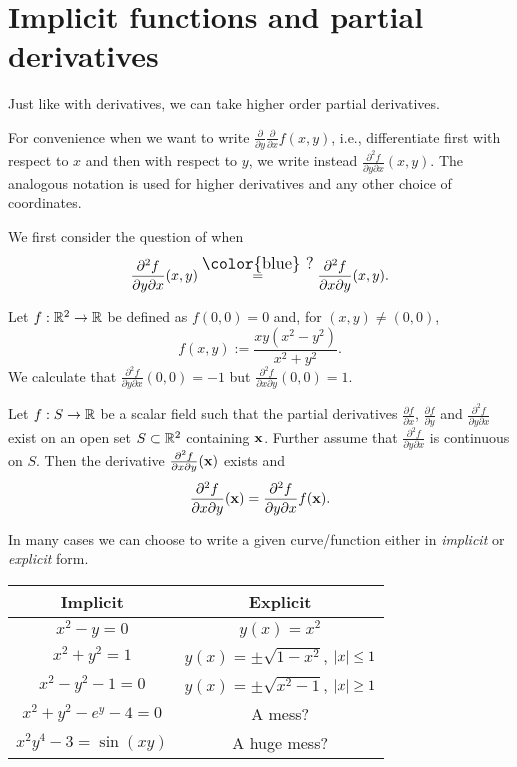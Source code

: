 \section{Implicit functions and partial derivatives}

Just like with derivatives, we can take higher order partial derivatives.
\begin{remark*}
    For convenience when we want to write \(\frac{\partial}{\partial y}\frac{\partial}{\partial x}f(x,y) \), i.e., differentiate first with respect to \(x\) and then with respect to \(y\), we write instead \(\frac{\partial^2 f}{\partial y \partial x}(x,y) \).
    The analogous notation is used for higher derivatives and any other choice of coordinates.
\end{remark*}

We first consider the question of when
\[
    \frac{\partial^2 f}{\partial y \partial x}(x,y)
    \overset{\text{\large\color{blue} ?}}{=}
    \frac{\partial^2 f}{\partial x \partial y}(x,y).
\]

\begin{example*}
    Let \(f:\mathbb{R}^2 \to \mathbb{R}\) be defined as \(f(0,0)=0\) and, for \((x,y)\neq (0,0)\),
    \[
        f(x,y) := \frac{x y(x^2 - y^2)}{x^2 + y^2}.
    \]
    We calculate that \(\frac{\partial^2 f}{\partial y \partial x} (0,0) = -1\) but
    \(\frac{\partial^2 f}{\partial x \partial y}(0,0) = 1\).
\end{example*}

\begin{theorem}
    Let \(f:S\to\mathbb{R}\) be a scalar field such that the partial derivatives \(\frac{\partial f}{\partial x }\), \(\frac{\partial f}{\partial y}\) and \(\frac{\partial^2 f}{\partial y \partial x} \) exist on an open set \(S\subset \mathbb{R}^2\) containing \(\mathbf{x}\).
    Further assume that \(\frac{\partial^2 f}{\partial y \partial x} \) is continuous on \(S\).
    Then the derivative \(\frac{\partial^2 f}{\partial x \partial y} (\mathbf{x})\) exists and
    \[
        \frac{\partial^2 f}{\partial x \partial y} (\mathbf{x})=\frac{\partial^2 f}{\partial y \partial x}  f(\mathbf{x}).
    \]
\end{theorem}

In many cases we can choose to write a given curve/function either in \emph{implicit} or \emph{explicit} form.

\begin{center}
    \begin{tabular}{c | c}
        \textbf{Implicit}         & \textbf{Explicit}                              \\
        \hline
        \(x^2-y=0\)               & \(y(x) = x^2\)                                 \\
        \(x^2+y^2=1\)             & \(y(x) = \pm \sqrt{1-x^2}\), \(\left|x\right|\leq 1\) \\
        \(x^2-y^2-1=0\)           & \(y(x) = \pm \sqrt{x^2-1}\), \(\left|x\right|\geq 1\) \\
        \(x^2+y^2-e^y -4 =0\)     & A mess?                                        \\
        \(x^2y^4 - 3 = \sin(xy)\) & A huge mess?
    \end{tabular}
\end{center}

